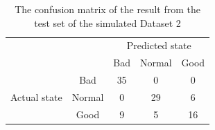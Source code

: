 \begin{table}[h]
\caption{The confusion matrix of the result from the test set of the simulated
Dataset 2}
\label{confusion2}
\centering{}%
\begin{tabular}{ccccc}
 & \multirow{1}{*}{} & \multicolumn{3}{c}{Predicted state}\tabularnewline
\cmidrule{2-5} 
 &  & Bad & Normal & Good\tabularnewline
\cmidrule{2-5} 
\multirow{3}{*}{Actual state} & Bad & 35 & 0 & 0\tabularnewline
\cmidrule{2-5} 
 & Normal & 0 & 29 & 6\tabularnewline
\cmidrule{2-5} 
 & Good & 9 & 5 & 16\tabularnewline
\cmidrule{2-5} 
\end{tabular}
\end{table}


